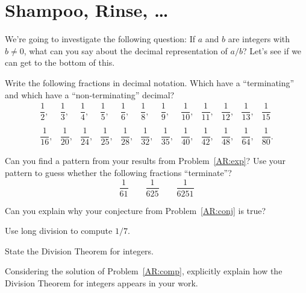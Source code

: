 \newpage
\section{Shampoo, Rinse, \dots}\label{A:Shampoo}


We're going to investigate the following question: If $a$ and $b$ are
integers with $b \ne 0$, what can you say about the decimal
representation of $a/b$? Let's see if we can get to the bottom of
this.

\begin{prob}\label{AR:exp}
Write the following fractions in decimal notation. Which have a
``terminating'' and which have a ``non-terminating'' decimal?
\[
\begin{array}{cccccccccccc}
 \dfrac{1}{2}, &  \dfrac{1}{3}, &  \dfrac{1}{4}, &  \dfrac{1}{5}, &  \dfrac{1}{6}, & \dfrac{1}{8}, & \dfrac{1}{9}, &  \dfrac{1}{10}, &  \dfrac{1}{11}, &  \dfrac{1}{12}, &  \dfrac{1}{13},  & \dfrac{1}{15}\\ \\
 \dfrac{1}{16}, & \dfrac{1}{20}, &  \dfrac{1}{24}, &  \dfrac{1}{25}, &  \dfrac{1}{28}, &  \dfrac{1}{32}, &  \dfrac{1}{35}, &  \dfrac{1}{40}, &  \dfrac{1}{42}, &  \dfrac{1}{48}, &  \dfrac{1}{64}, &  \dfrac{1}{80}.
\end{array}
\]
\end{prob}

\begin{prob}\label{AR:conj}
Can you find a pattern from your results from Problem~\ref{AR:exp}?
Use your pattern to guess whether the following fractions
``terminate''?  
\[
\dfrac{1}{61}\qquad \dfrac{1}{625} \qquad \dfrac{1}{6251}
\]
\end{prob}


\begin{prob}
Can you explain why your conjecture from Problem~\ref{AR:conj} is true?
\end{prob}

\begin{prob}\label{AR:comp} Use long division to compute $1/7$.
\end{prob}

\begin{prob}
State the Division Theorem for integers.
\end{prob}

\begin{prob}\label{AR:div}
Considering the solution of Problem~\ref{AR:comp}, explicitly
explain how the Division Theorem for integers appears in your work.
\end{prob}


